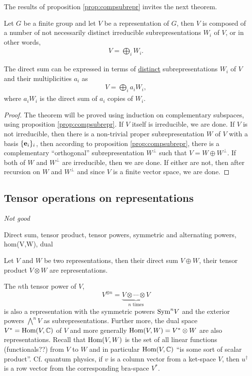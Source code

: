 		The results of proposition \ref{prop:compsubrepr} invites the next theorem.
		
		\begin{theorem}\label{thm:maschke}
			Let $G$ be a finite group and let $V$ be a representation of $G$, then $V$ is composed of a number of not necessarily distinct irreducible subrepresentations $W_i$ of $V$, or in other words,
			\begin{align}
				V = \bigoplus_i W_i.
			\end{align}
			\begin{note}
				The direct sum can be expressed in terms of \underline{distinct} subrepresentations $W_i$ of $V$ and their multiplicities $a_i$ as
				\begin{align}
					V = \bigoplus_i a_i W_i,
				\end{align}
				where $a_i W_i$ is the direct sum of $a_i$ copies of $W_i$.
			\end{note}
		\end{theorem}
		\begin{proof}
			The theorem will be proved using induction on complementary subspaces, using proposition \ref{prop:compsubrepr}. If $V$ itself is irreducible, we are done. If $V$ is not irreducible, then there is a non-trivial proper subrepresentation $W$ of $V$ with a basis $\{\mathbf{e}_i\}_i$, then according to proposition \ref{prop:compsubrepr}, there is a complementary ``orthogonal'' subrepresentation $W^\perp$ such that $V = W \oplus W^\perp$. If both of $W$ and $W^\perp$ are irreducible, then we are done. If either are not, then after recursion on $W$ and $W^\perp$ and since $V$ is a finite vector space, we are done.
		\end{proof}
	
	\subsection{Tensor operations on representations}
	
	\textit{Not good}
	
	Direct sum, tensor product, tensor powers, symmetric and alternating powers, hom(V,W), dual
	
	Let $V$ and $W$ be two representations, then their direct sum $V \oplus W$, their tensor product $V \otimes W$ are representations.
	
	The $n$th tensor power of $V$, \[V^{\otimes n} = \underset{n \text{ times}}{\underbrace{V \otimes \cdots \otimes V}}\] is also a representation with the symmetric powers $\text{Sym}^n V$ and the exterior powers $ \bigwedge^n V$ as subrepresentations. Further more, the dual space $V^* = \text{Hom}(V,\mathbb{C})$ of $V$ and more generally $\text{Hom}(V,W) = V^* \otimes W$ are also representations. Recall that $\text{Hom}(V,W)$ is the set of all linear functions (functionals??) from $V$ to $W$ and in particular $\text{Hom}(V, \mathbb{C})$ ``is some sort of scalar product''. Cf. quantum physics, if $v$ is a column vector from a ket-space $V$, then $u^\dagger$ is a row vector from the corresponding bra-space $V^*$.
	
	
